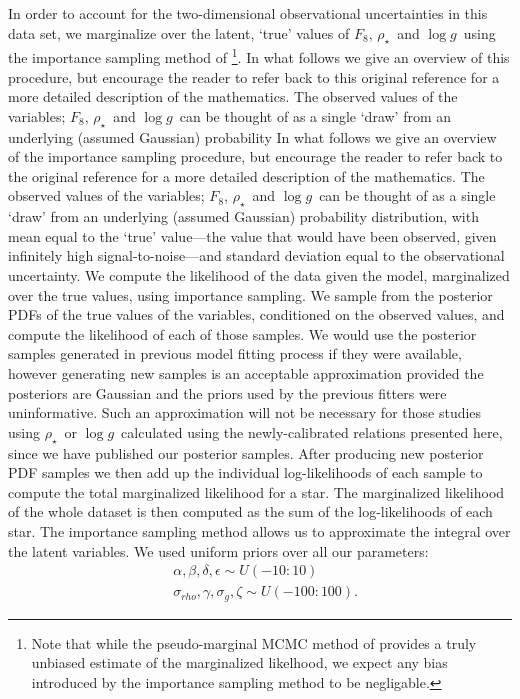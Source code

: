 \documentclass[apjl]{emulateapj}
\newcommand{\logg}{$\log g$}
\newcommand{\rhostar}{$\rho_{\star}$}
\begin{document}
In order to account for the two-dimensional observational uncertainties in
this data set, we marginalize over the latent, `true' values of $F_8$,
\rhostar\ and \logg\ using the importance sampling method of
\citep{hogg:2010}\footnote{Note that while the pseudo-marginal MCMC method of
\citep{andrieu:2009} provides a truly unbiased estimate of the marginalized
likelhood, we expect any bias introduced by the importance sampling method to
be negligable.}.
In what follows we give an overview of this procedure, but encourage the
reader to refer back  to this original reference for a more detailed
description of the mathematics.
The observed values of the variables; $F_8$, \rhostar\ and \logg\ can be
thought of as a single `draw' from an underlying (assumed Gaussian)
probability
In what follows we give an overview of the importance sampling procedure, but
encourage the reader to refer back to the original reference for a more
detailed description of the mathematics.
The observed values of the variables; $F_8$, \rhostar\ and \logg\ can be
thought of as a single `draw' from an underlying (assumed Gaussian)
probability distribution, with mean equal to the `true' value---the value that
would have been observed, given infinitely high signal-to-noise---and standard
deviation equal to the observational uncertainty.
We compute the likelihood of the data given the model, marginalized over the
true values, using importance sampling.
We sample from the posterior PDFs of the true values of the variables,
conditioned on the observed values, and compute the likelihood of each of those
samples.
We would use the posterior samples generated in previous model fitting process
if they were available, however generating new samples is an acceptable
approximation provided the posteriors are Gaussian and the priors used by the
previous fitters were uninformative.
Such an approximation will not be necessary for those studies using \rhostar\
or \logg\ calculated using the newly-calibrated relations presented here,
since we have published our posterior samples.
After producing new posterior PDF samples we then add up the individual
log-likelihoods of each sample to compute the total marginalized likelihood
for a star.
The marginalized likelihood of the whole dataset is then computed as the sum
of the log-likelihoods of each star.
The importance sampling method allows us to approximate the integral over the
latent variables.
We used uniform priors over all our parameters:
\begin{eqnarray}
	&	\alpha, \beta, \delta, \epsilon
	\sim U(-10:10) \\ \nonumber
 	&	\sigma_{rho}, \gamma, \sigma_g, \zeta  \sim U(-100:100).
\end{eqnarray}
\label{eq:priors}
\end{document}
